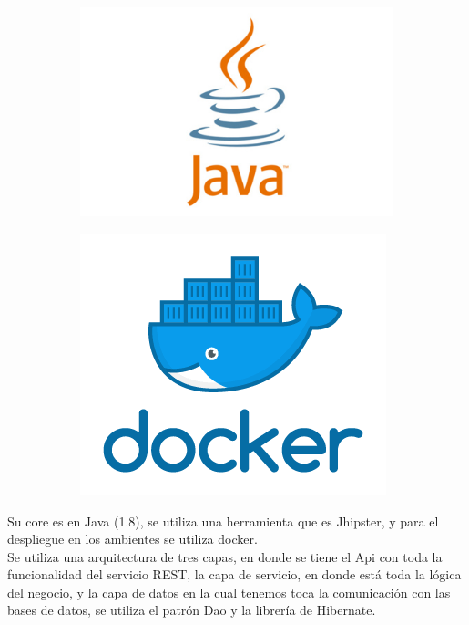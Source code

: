 \begin{figure}[h!]
\begin{subfigure}{.1\textwidth}
  \includegraphics[width=\linewidth]{Desarrollo/Arquitectura/imgs/java.jpg}
\end{subfigure}
\begin{subfigure}{.1\textwidth}
  \includegraphics[width=0.9\linewidth]{Desarrollo/Arquitectura/imgs/docker_facebook_share.png}
\end{subfigure}
\end{figure}

Su core es en Java (1.8), se utiliza una herramienta que es Jhipster, y para el despliegue en los ambientes se utiliza docker. \\

Se utiliza una arquitectura de tres capas, en donde se tiene el Api con toda la funcionalidad del servicio REST, la capa de servicio, en donde está toda la lógica del negocio, y la capa de datos en la cual tenemos toca la comunicación con las bases de datos, se utiliza el patrón Dao y la librería de Hibernate.

